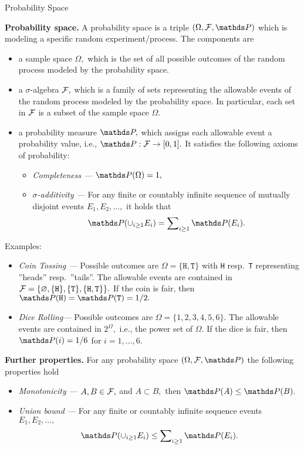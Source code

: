 \begin{vbframe}{Probability Space}
	
	\textbf{Probability space.} A probability space is a triple $(\Omega,\F,\P)$ which is modeling a specific random experiment/process.
		The components are
		\begin{itemize}
			\item a sample space $\Omega,$ which is the set of all possible outcomes of the random process modeled by the probability space.
			\item a $\sigma$-algebra $\mathcal{F},$ which is a family of sets representing the allowable events of the random process modeled by the probability space.
			In particular, each set in $\mathcal{F}$ is a subset of the sample space $\Omega.$
			\item a probability measure $\P,$ which assigns each allowable event a probability value, i.e., $\P:\F\to[0,1].$ It satisfies the following axioms of probability:
			\begin{itemize}
				\item  \emph{Completeness ---} $\P(\Omega)=1,$  
				\item  \emph{$\sigma$-additivity ---} For any finite or countably infinite sequence of mutually disjoint events $E_1,E_2,\ldots,$ it holds that
				$$\P(\cup_{i\geq1}  E_i) = \sum\nolimits_{i\geq 1} \P(E_i).$$
			\end{itemize}
		\end{itemize}
		\framebreak
		Examples:
		\begin{itemize}
			\item \emph{Coin Tossing ---} Possible outcomes are $\Omega=\{\texttt{H},\texttt{T} \}$ with \texttt{H} resp.\ \texttt{T} representing ''heads'' resp.\ ''tails''. The allowable events are contained in $\mathcal{F}=\{\varnothing,  \{\texttt{H}\} , \{\texttt{T}\}, \{\texttt{H},\texttt{T}\}  \}.$ If the coin is fair, then $\P(\texttt{H})=\P(\texttt{T})=1/2.$
			\item \emph{Dice Rolling---} Possible outcomes are $\Omega=\{1,2,3,4,5,6\}.$  The allowable events are contained in $2^\Omega,$ i.e., the power set of $\Omega.$
			If the dice is fair, then $\P(i)=1/6$ for $i=1,\ldots,6.$
		\end{itemize}
		\textbf{Further properties.} For any probability space $(\Omega,\F,\P)$ the following properties hold
		\begin{itemize}
			\item \emph{Monotonicity ---} $A,B\in \mathcal{F},$ and $A\subset B,$ then $\P(A)\leq \P(B).$
			\item \emph{Union bound ---}  For any finite or countably infinite sequence events $E_1,E_2,\ldots,$ 
			$$\P(\cup_{i\geq1}  E_i) \leq \sum\nolimits_{i\geq 1} \P(E_i).$$
		\end{itemize}

\end{vbframe}


